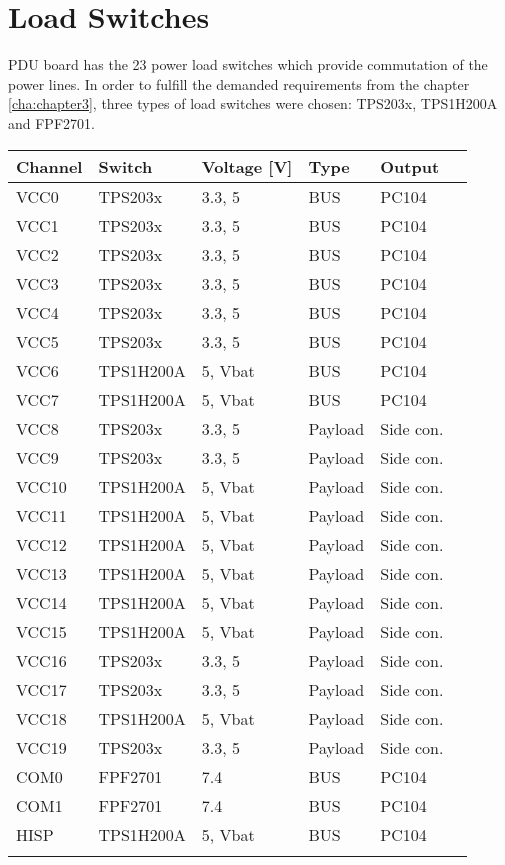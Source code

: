 \section{Load Switches}
PDU board has the 23 power load switches which provide commutation of the power lines. In order to fulfill the demanded requirements from the chapter \ref{cha:chapter3}, three types of load switches were chosen: TPS203x, TPS1H200A and FPF2701. 
\begin{tabular}{p{2cm}p{2cm}p{2cm}p{2cm}p{2cm}p{2cm}} \toprule
	Channel & Switch  & Voltage [V] & Type & Output\\ \midrule
	VCC0 & TPS203x & 3.3, 5 & BUS & PC104\\
	VCC1 & TPS203x & 3.3, 5 & BUS & PC104\\
	VCC2 & TPS203x & 3.3, 5 & BUS & PC104\\
	VCC3 & TPS203x & 3.3, 5 & BUS & PC104\\
	VCC4 & TPS203x & 3.3, 5 & BUS & PC104\\
    VCC5 & TPS203x & 3.3, 5 & BUS & PC104\\
    VCC6 & TPS1H200A & 5, Vbat & BUS & PC104\\
    VCC7 & TPS1H200A & 5, Vbat & BUS & PC104\\
    VCC8 & TPS203x & 3.3, 5 & Payload & Side con.\\
    VCC9 & TPS203x & 3.3, 5 & Payload & Side con.\\
    VCC10 & TPS1H200A & 5, Vbat & Payload & Side con.\\
    VCC11 & TPS1H200A & 5, Vbat & Payload & Side con.\\
    VCC12 & TPS1H200A & 5, Vbat & Payload & Side con.\\
    VCC13 & TPS1H200A & 5, Vbat & Payload & Side con.\\
    VCC14 & TPS1H200A & 5, Vbat & Payload & Side con.\\
    VCC15 & TPS1H200A & 5, Vbat & Payload & Side con.\\
    VCC16 & TPS203x & 3.3, 5 & Payload & Side con.\\
    VCC17 & TPS203x & 3.3, 5 & Payload & Side con.\\
    VCC18 & TPS1H200A & 5, Vbat & Payload & Side con.\\
    VCC19 & TPS203x & 3.3, 5 & Payload & Side con.\\
    COM0 & FPF2701 & 7.4 & BUS & PC104\\
    COM1 & FPF2701 & 7.4 & BUS & PC104\\
    HISP & TPS1H200A & 5, Vbat & BUS & PC104\\ \\
	\bottomrule
	
\end{tabular}\\ \\ \\ \\

